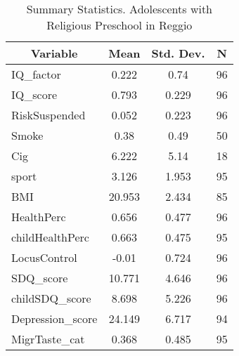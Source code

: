 
\begin{table}[htbp]\centering \caption{Summary Statistics. Adolescents with Religious Preschool in Reggio \label{bothAdolmaternaReliReggio}}
\begin{tabular}{l c c  c}\hline\hline
\multicolumn{1}{c}{\textbf{Variable}} & \textbf{Mean}
 & \textbf{Std. Dev.} & \textbf{N}\\ \hline
IQ\_factor & 0.222 & 0.74  & 96\\
IQ\_score & 0.793 & 0.229  & 96\\
RiskSuspended & 0.052 & 0.223  & 96\\
Smoke & 0.38 & 0.49  & 50\\
Cig & 6.222 & 5.14  & 18\\
sport & 3.126 & 1.953  & 95\\
BMI & 20.953 & 2.434  & 85\\
HealthPerc & 0.656 & 0.477  & 96\\
childHealthPerc & 0.663 & 0.475  & 95\\
LocusControl & -0.01 & 0.724  & 96\\
SDQ\_score & 10.771 & 4.646  & 96\\
childSDQ\_score & 8.698 & 5.226  & 96\\
Depression\_score & 24.149 & 6.717  & 94\\
MigrTaste\_cat & 0.368 & 0.485  & 95\\
\hline\end{tabular}
\end{table}
